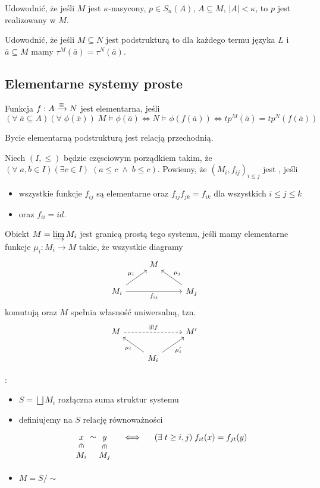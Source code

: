 \begin{zadanie}
  Udowodnić, że jeśli $M$ jest $\kappa$-nasycony, $p\in S_n(A)$, $A\subseteq M$, $|A|<\kappa$, to $p$ jest realizowany w $M$.
\end{zadanie}

\begin{zadanie}
  Udowodnić, że jeśli $M\subseteq N$ jest podstrukturą to dla każdego termu języka $L$ i $\overline{a}\subseteq M$ mamy $\tau^M(\overline{a})=\tau^N(\overline{a})$.
\end{zadanie}

\subsection{Elementarne systemy proste}

Funkcja $f:A\xrightarrow{\equiv} N$ jest elementarna, jeśli 
$$(\forall\;\overline{a}\subseteq A)(\forall\;\phi(\overline{x}))\;M\models \phi(\overline{a})\iff N\models\phi(f(\overline{a}))\iff tp^M(\overline{a})=tp^N(f(\overline{a}))$$

Bycie elementarną podstrukturą jest relacją przechodnią.

Niech $(I,\leq)$ będzie częsciowym porządkiem takim, że $(\forall\;a,b\in I)(\exists c\in I)\;(a\leq c\;\land\;b\leq c)$. Powiemy, że $(M_i, f_{ij})_{i\leq j}$ jest , jeśli 
\begin{itemize} 
  \item wszystkie funkcje $f_{ij}$ są elementarne oraz $f_{ij}f_{jk}=f_{ik}$ dla wszystkich $i\leq j\leq k$ 
  \item oraz $f_{ii}=id$.
\end{itemize}
Obiekt $M=\varinjlim M_i$ jest granicą prostą tego systemu, jeśli mamy elementarne funkcje $\mu_i:M_i\to M$ takie, że wszystkie diagramy
$$\begin{tikzcd}
  & M \\ 
  M_i\arrow[ur, "\mu_i" above left]\arrow[rr, "f_{ij}" below] & & M_j\arrow[ul, "\mu_j" above right]
\end{tikzcd}$$
komutują oraz $M$ spełnia własność uniwersalną, tzn.
$$\begin{tikzcd}
  M \arrow[rr, dashed, "\exists!f"] & & M' \\ 
                                    & M_i\arrow[ur, "\mu_i'" below right]\arrow[ul, "\mu_i" below left]
\end{tikzcd}$$

:
\begin{itemize}
  \item $S=\bigsqcup M_i$ rozłączna suma struktur systemu
  \item definiujemy na $S$ relację równoważności
    $$\begin{tikzcd}[column sep=tiny, row sep=tiny]
      x\arrow[r, phantom, sloped, "\sim"] & y &\iff & (\exists\;t\geq i,j)\;f_{it}(x)=f_{jt}(y) \\ 
      M_i\arrow[u, sloped, phantom, "\ni"] & M_j\arrow[u, sloped, phantom, "\ni"]
    \end{tikzcd}$$
  \item $M=S/\sim$
\end{itemize}

